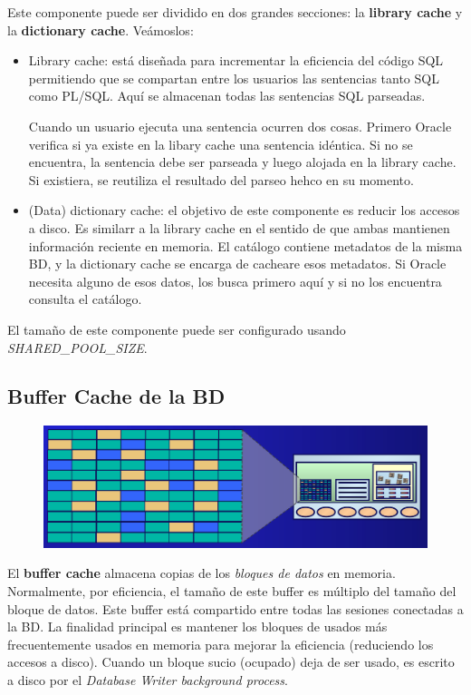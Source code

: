 Este componente puede ser dividido en dos grandes secciones: la \textbf{library cache} y la \textbf{dictionary cache}. Veámoslos:
\begin{itemize}
\item Library cache: está diseñada para incrementar la eficiencia del código SQL permitiendo que se compartan entre los usuarios las sentencias tanto SQL como PL/SQL. Aquí se almacenan todas las sentencias SQL parseadas. 

Cuando un usuario ejecuta una sentencia ocurren dos cosas. Primero Oracle verifica si ya existe en la libary cache una sentencia idéntica. Si no se encuentra, la sentencia debe ser parseada y luego alojada en la library cache. Si existiera, se reutiliza el resultado del parseo hehco en su momento.

\item (Data) dictionary cache: el objetivo de este componente es reducir los accesos a disco. Es similarr a la library cache en el sentido de que ambas mantienen información reciente en memoria. El catálogo contiene metadatos de la misma BD, y la dictionary cache se encarga de cacheare esos metadatos. Si Oracle necesita alguno de esos datos, los busca primero aquí y si no los encuentra consulta el catálogo.
\end{itemize}

El tamaño de este componente puede ser configurado usando \textit{SHARED\_POOL\_SIZE}.

\subsection{Buffer Cache de la BD}

\begin{figure}[H]
  \center
  \includegraphics[scale=0.2]{img/p4.png}
\end{figure}

El \textbf{buffer cache} almacena copias de los \textit{bloques de datos} en memoria. Normalmente, por eficiencia, el tamaño de este buffer es múltiplo del tamaño del bloque de datos. Este buffer está compartido entre todas las sesiones conectadas a la BD. La finalidad principal es mantener los bloques de usados más frecuentemente usados en memoria para mejorar la eficiencia (reduciendo los accesos a disco). Cuando un bloque sucio (ocupado) deja de ser usado, es escrito a disco por el \textit{Database Writer background process}.

